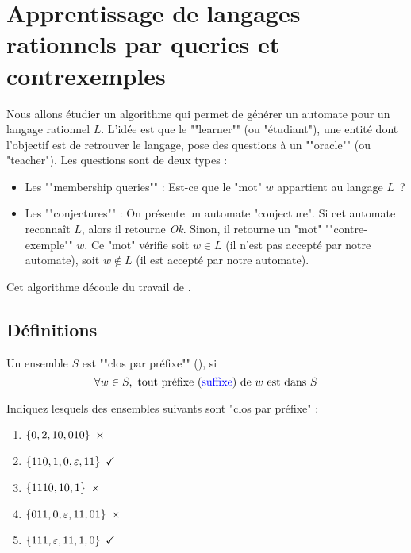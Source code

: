 \section{Apprentissage de langages rationnels par queries et contrexemples}

Nous allons étudier un algorithme qui permet de générer un automate pour un langage rationnel $L$.
L'idée est que le ""learner"" (ou "étudiant"), une entité dont l'objectif est de retrouver le langage, pose des
questions à un ""oracle"" (ou "teacher"). Les questions sont de deux types :

\begin{itemize}
	\item Les ""membership queries"" : Est-ce que le "mot" $w$  appartient au langage $L$ ?
	\item Les ""conjectures"" : On présente un automate "conjecture". Si cet automate reconnaît $L$, alors il retourne \emph{Ok}.
	      Sinon, il retourne un "mot" ""contre-exemple"" $w$. Ce "mot" vérifie soit $w \in L$ (il n’est pas accepté par notre
	      automate), soit $w \notin L$ (il est accepté par notre automate).
\end{itemize}

Cet algorithme découle du travail de \cite{angluinLearning}.


\subsection{Définitions}


\begin{definition}
	Un ensemble $S$ est ""clos par préfixe"" (), si
	$$\forall w \in S, \text{ tout préfixe (\textcolor{blue}{suffixe}) de $w$ est dans } S$$
\end{definition}

\begin{exercice}
	Indiquez lesquels des ensembles suivants sont "clos par préfixe" :
	\begin{enumerate}
		\item $\set{0,2,10,010} \ \times$
		\item $\set{110,1,0,\motvide,11} \ \checkmark$
		\item $\set{1110,10,1} \ \times$
		\item $\set{011,0,\motvide,11,01} \ \times$
		\item $\set{111,\motvide,11,1,0} \ \checkmark$
	\end{enumerate}
\end{exercice}

